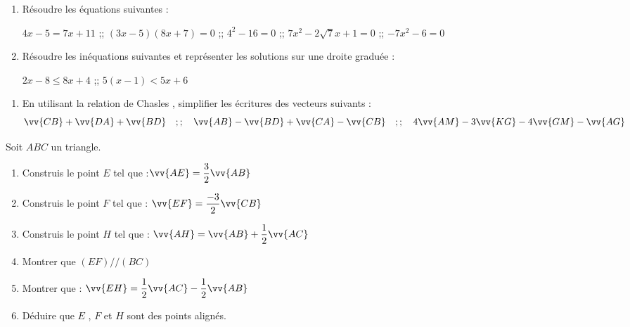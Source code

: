 \documentclass[a4paper,12pt]{article}
\begin{document}
\devoir[prv=true,ds=false,num=4 ,niv=3,sem=2 ,date=23/02/2023,Rdate=27/02/2023]

\begin{exo}
\begin{enumerate}
\item Résoudre les équations suivantes :

$4x-5=7x+11$ ;; $(3x-5)(8x+7)=0$ ;; $4^{2}-16=0$ ;; $7x^{2}-2\sqrt{7}x+1=0$ ;; $-7x^{2}-6=0$
\item Résoudre les inéquations suivantes et représenter les solutions sur une droite graduée :

$2x-8\leq 8x+4$ ;; $5(x-1)< 5x+6$
\end{enumerate}
\end{exo}

\begin{exo}
\begin{enumerate}
\item En utilisant la relation de Chasles , simplifier les écritures des vecteurs suivants :
\[
\vv{CB}+\vv{DA}+\vv{BD}\quad ;;\quad
 \vv{AB}-\vv{BD}+\vv{CA}-\vv{CB}\quad ;;\quad
 4\vv{AM}-3\vv{KG}-4\vv{GM}-\vv{AG}
\]
\end{enumerate}
\end{exo}

\begin{exo}
Soit $ABC$ un triangle.
\begin{enumerate}
\item Construis le point $E$ tel que :$\vv{AE}=\dfrac{3}{2}\vv{AB}$
\item Construis le point $F$ tel que : $\vv{EF}=\dfrac{-3}{2}\vv{CB}$
\item Construis le point $H$ tel que : $\vv{AH}=\vv{AB}+\dfrac{1}{2}\vv{AC}$
\item Montrer que $(EF)//(BC)$
\item Montrer que : $\vv{EH}=\dfrac{1}{2}\vv{AC}-\dfrac{1}{2}\vv{AB}$
\item Déduire que $E$ , $F$ et $H$ sont des points alignés.
\end{enumerate}
\end{exo}

\end{document}
